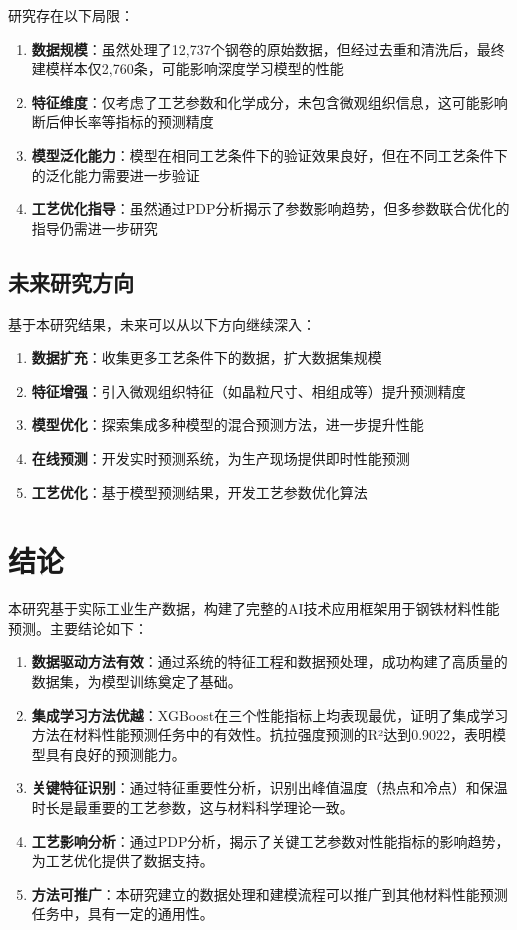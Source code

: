 \documentclass[12pt,a4paper]{article}
\begin{document}
研究存在以下局限：
\begin{enumerate}
\item \textbf{数据规模}：虽然处理了12,737个钢卷的原始数据，但经过去重和清洗后，最终建模样本仅2,760条，可能影响深度学习模型的性能
\item \textbf{特征维度}：仅考虑了工艺参数和化学成分，未包含微观组织信息，这可能影响断后伸长率等指标的预测精度
\item \textbf{模型泛化能力}：模型在相同工艺条件下的验证效果良好，但在不同工艺条件下的泛化能力需要进一步验证
\item \textbf{工艺优化指导}：虽然通过PDP分析揭示了参数影响趋势，但多参数联合优化的指导仍需进一步研究
\end{enumerate}

\subsection{未来研究方向}

基于本研究结果，未来可以从以下方向继续深入：
\begin{enumerate}
\item \textbf{数据扩充}：收集更多工艺条件下的数据，扩大数据集规模
\item \textbf{特征增强}：引入微观组织特征（如晶粒尺寸、相组成等）提升预测精度
\item \textbf{模型优化}：探索集成多种模型的混合预测方法，进一步提升性能
\item \textbf{在线预测}：开发实时预测系统，为生产现场提供即时性能预测
\item \textbf{工艺优化}：基于模型预测结果，开发工艺参数优化算法
\end{enumerate}

\section{结论}

本研究基于实际工业生产数据，构建了完整的AI技术应用框架用于钢铁材料性能预测。主要结论如下：

\begin{enumerate}
\item \textbf{数据驱动方法有效}：通过系统的特征工程和数据预处理，成功构建了高质量的数据集，为模型训练奠定了基础。

\item \textbf{集成学习方法优越}：XGBoost在三个性能指标上均表现最优，证明了集成学习方法在材料性能预测任务中的有效性。抗拉强度预测的R²达到0.9022，表明模型具有良好的预测能力。

\item \textbf{关键特征识别}：通过特征重要性分析，识别出峰值温度（热点和冷点）和保温时长是最重要的工艺参数，这与材料科学理论一致。

\item \textbf{工艺影响分析}：通过PDP分析，揭示了关键工艺参数对性能指标的影响趋势，为工艺优化提供了数据支持。

\item \textbf{方法可推广}：本研究建立的数据处理和建模流程可以推广到其他材料性能预测任务中，具有一定的通用性。
\end{enumerate}
\end{document}
